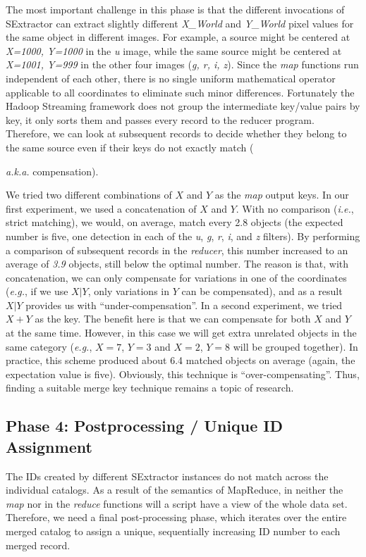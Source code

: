 The most important challenge in this phase is that the different invocations of SExtractor can extract slightly different \textit{X\_World} and \textit{Y\_World} pixel values for the same object in different images. For example, a source might be centered at \textit{X=1000, Y=1000} in the \textit{u} image, while the same source might be centered at \textit{X=1001, Y=999} in the other four images (\textit{g, r, i, z}). Since the \textit{map} functions run independent of each other, there is no single uniform mathematical operator applicable to all coordinates to eliminate such minor differences. Fortunately the Hadoop Streaming framework does not group the intermediate key/value pairs by key, it only sorts them and passes every record to the reducer program. Therefore, we can look at subsequent records to decide whether they belong to the same source even if their keys do not exactly match ({\textit{a.k.a.} compensation).  

We tried two different combinations of $X$ and $Y$ as the \textit{map} output keys. In our first experiment, we used a concatenation of $X$ and $Y$. With no comparison (\textit{i.e.}, strict matching), we would, on average, match every 2.8 objects (the expected number is five, one detection in each of the \textit{u}, \textit{g}, \textit{r}, \textit{i}, and \textit{z} filters). By performing a comparison of subsequent records in the \textit{reducer}, this number increased to an average of \textit{3.9} objects, still below the optimal number. The reason is that, with concatenation, we can only compensate for variations in one of the coordinates (\textit{e.g.}, if we use $X|Y$, only variations in $Y$ can be compensated), and as a result $X|Y$ provides us with ``under-compensation''. In a second experiment, we tried $X+Y$ as the key. The benefit here is that we can compensate for both $X$ and $Y$ at the same time. However, in this case we will get extra unrelated objects in the same category (\textit{e.g.}, $X=7$, $Y=3$ and $X=2$, $Y=8$ will be grouped together). In practice, this scheme produced about 6.4 matched objects on average (again, the expectation value is five). Obviously, this technique is ``over-compensating''. Thus, finding a suitable merge key technique remains a topic of research.

\subsection{Phase 4: Postprocessing / Unique ID Assignment} 
The IDs created by different SExtractor instances do not match across the individual catalogs. As a result of the semantics of MapReduce, in neither the \textit{map} nor in the \textit{reduce} functions will a script have a view of the whole data set. Therefore, we need a final post-processing phase, which iterates over the entire merged catalog to assign a unique, sequentially increasing ID number to each merged record.

}
